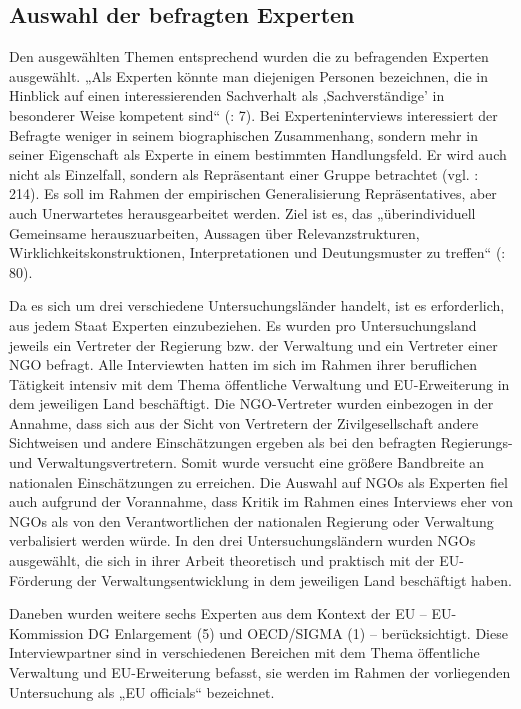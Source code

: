 \subsection{Auswahl der befragten Experten}
Den ausgewählten Themen entsprechend wurden die zu befragenden Experten ausgewählt. „Als Experten könnte man diejenigen Personen bezeichnen, die in Hinblick auf einen interessierenden Sachverhalt als ‚Sachverständige’ in besonderer Weise kompetent sind“ (\cite{deeke}: 7). Bei Experteninterviews interessiert der Befragte weniger in seinem biographischen Zusammenhang, sondern mehr in seiner Eigenschaft als Experte in einem bestimmten Handlungsfeld. Er wird auch nicht als Einzelfall, sondern als Repräsentant einer Gruppe betrachtet (vgl. \cite{flick10}: 214). Es soll im Rahmen der empirischen Generalisierung Repräsentatives, aber auch Unerwartetes herausgearbeitet werden. Ziel ist es, das „überindividuell Gemeinsame herauszuarbeiten, Aussagen über Relevanzstrukturen, Wirklichkeitskonstruktionen, Interpretationen und Deutungsmuster zu treffen“ (\cite{meuser}: 80).\par
Da es sich um drei verschiedene Untersuchungsländer handelt, ist es erforderlich, aus jedem Staat Experten einzubeziehen. Es wurden pro Untersuchungsland jeweils ein Vertreter der Regierung bzw. der Verwaltung und ein Vertreter einer NGO befragt. Alle Interviewten hatten im sich im Rahmen ihrer beruflichen Tätigkeit intensiv mit dem Thema öffentliche Verwaltung und EU-Erweiterung in dem jeweiligen Land beschäftigt. Die NGO-Vertreter wurden einbezogen in der Annahme, dass sich aus der Sicht von Vertretern der Zivilgesellschaft andere Sichtweisen und andere Einschätzungen ergeben als bei den befragten Regierungs- und Verwaltungsvertretern. Somit wurde versucht eine größere Bandbreite an nationalen Einschätzungen zu erreichen. Die Auswahl auf NGOs als Experten fiel auch aufgrund der Vorannahme, dass Kritik im Rahmen eines Interviews eher von NGOs als von den Verantwortlichen der nationalen Regierung oder Verwaltung verbalisiert werden würde. In den drei Untersuchungsländern wurden NGOs ausgewählt, die sich in ihrer Arbeit theoretisch und praktisch mit der EU-Förderung der Verwaltungsentwicklung in dem jeweiligen Land beschäftigt haben.\par
Daneben wurden weitere sechs Experten aus dem Kontext der EU – EU-Kommission DG Enlargement (5) und OECD/SIGMA (1) – berücksichtigt. Diese Interviewpartner sind in verschiedenen Bereichen mit dem Thema öffentliche Verwaltung und EU-Erweiterung befasst, sie werden im Rahmen der vorliegenden Untersuchung als „EU officials“ bezeichnet.\par
